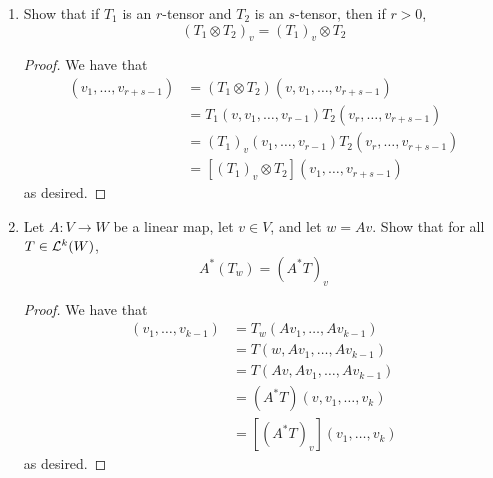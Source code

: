 \documentclass[../psets.tex]{subfiles}
\begin{document}
\begin{enumerate}[label={\textbf{1.3.\roman*.}}]
\begin{proof}
\begin{align*}
        \end{align*}
        as desired.
    \end{proof}
    \item Show that if $T_1$ is an $r$-tensor and $T_2$ is an $s$-tensor, then if $r>0$,
    \begin{equation*}
        (T_1\otimes T_2)_v = (T_1)_v\otimes T_2
    \end{equation*}
    \begin{proof}
        We have that
        \begin{align*}
            [(T_1\otimes T_2)_v](v_1,\dots,v_{r+s-1}) &= (T_1\otimes T_2)(v,v_1,\dots,v_{r+s-1})\\
            &= T_1(v,v_1,\dots,v_{r-1})T_2(v_r,\dots,v_{r+s-1})\\
            &= (T_1)_v(v_1,\dots,v_{r-1})T_2(v_r,\dots,v_{r+s-1})\\
            &= [(T_1)_v\otimes T_2](v_1,\dots,v_{r+s-1})
        \end{align*}
        as desired.
    \end{proof}
    \item Let $A:V\to W$ be a linear map, let $v\in V$, and let $w=Av$. Show that for all $T\in\lin[k]{W}$,
    \begin{equation*}
        A^*(T_w) = (A^*T)_v
    \end{equation*}
    \begin{proof}
        We have that
        \begin{align*}
            [A^*(T_w)](v_1,\dots,v_{k-1}) &= T_w(Av_1,\dots,Av_{k-1})\\
            &= T(w,Av_1,\dots,Av_{k-1})\\
            &= T(Av,Av_1,\dots,Av_{k-1})\\
            &= (A^*T)(v,v_1,\dots,v_k)\\
            &= [(A^*T)_v](v_1,\dots,v_k)
        \end{align*}
        as desired.
    \end{proof}
\end{enumerate}
\end{document}
